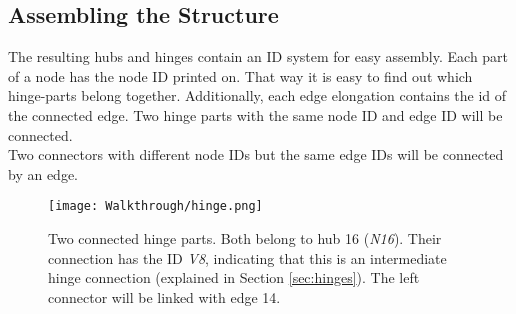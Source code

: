 \subsection{Assembling the Structure}
The resulting hubs and hinges contain an ID system for easy assembly. Each part of a node has the node ID printed on. That way it is easy to find out which hinge-parts belong together. Additionally, each edge elongation contains the id of the connected edge. Two hinge parts with the same node ID and edge ID will be connected.\\
Two connectors with different node IDs but the same edge IDs will be connected by an edge.
\begin{figure}[ht!]
    \texttt{[image: Walkthrough/hinge.png]}
    \centering
    \caption{Two connected hinge parts. Both belong to hub 16 (\textit{N16}). Their connection has the ID \textit{V8}, indicating that this is an intermediate hinge connection (explained in Section \ref{sec:hinges}). The left connector will be linked with edge 14.}
    \label{fig:hinge}
\end{figure}
